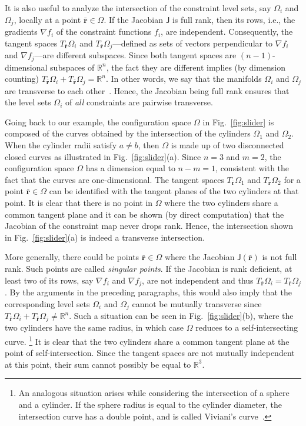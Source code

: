 It is also useful to analyze the intersection of the constraint level sets, say $\Omega_i$ and $\Omega_j$, locally at a point $\bar{\bm{r}} \in \Omega$.
If the Jacobian $\mathsf{J}$ is full rank, then its rows, i.e., the gradients $\nabla f_i$ of the constraint functions $f_i$, are independent.
Consequently, the tangent spaces $T_{\bar{\bm{r}}}{\Omega_i}$ and $T_{\bar{\bm{r}}}{\Omega_j}$---defined as sets of vectors perpendicular to $\nabla f_i$ and $\nabla f_j$---are different subspaces.
Since both tangent spaces are $(n-1)$-dimensional subspaces of $\mathbb{R}^n$, the fact they are different implies (by dimension counting) $T_{\bar{\bm{r}}}{\Omega_i} + T_{\bar{\bm{r}}}{\Omega_j} = \mathbb{R}^n$.
In other words, we say that the manifolds $\Omega_i$ and $\Omega_j$ are transverse to each other~\cite{guillemin1974}.
Hence, the Jacobian being full rank ensures that the level sets $\Omega_i$ of \emph{all} constraints are pairwise transverse.

Going back to our example, the configuration space $\Omega$ in Fig.~\ref{fig:slider} is composed of the curves obtained by the intersection of the cylinders $\Omega_1$ and $\Omega_2$.
When the cylinder radii satisfy $a \neq b$, then $\Omega$ is made up of two disconnected closed curves as illustrated in Fig.~\ref{fig:slider}(a).
Since $n = 3$ and $m=2$, the configuration space $\Omega$ has a dimension equal to $n-m=1$, consistent with the fact that the curves are one-dimensional.
The tangent spaces $T_{\bar{\bm{r}}}\Omega_1$ and $T_{\bar{\bm{r}}}\Omega_2$ for a point $\bar{\bm{r}} \in \Omega$ can be identified with the tangent planes of the two cylinders at that point.
It is clear that there is no point in $\Omega$ where the two cylinders share a common tangent plane and it can be shown (by direct computation) that the Jacobian of the constraint map never drops rank.
Hence, the intersection shown in Fig.~\ref{fig:slider}(a) is indeed a transverse intersection.

More generally, there could be points $\bar{\bm{r}} \in \Omega$ where the Jacobian $\mathsf{J}(\bar{\bm{r}})$ is not full rank.
Such points are called \emph{singular points}.
If the Jacobian is rank deficient, at least two of its rows, say $\nabla f_i$ and $\nabla f_j$, are not independent and thus $T_{\bar{\bm{r}}}\Omega_i = T_{\bar{\bm{r}}}\Omega_j$.
By the arguments in the preceding paragraphs, this would also imply that the corresponding level sets $\Omega_i$ and $\Omega_j$ cannot be mutually transverse since $T_{\bar{\bm{r}}}\Omega_i + T_{\bar{\bm{r}}}\Omega_j \neq \mathbb{R}^n$.
Such a situation can be seen in Fig.~\ref{fig:slider}(b), where the two cylinders have the same radius, in which case $\Omega$ reduces to a self-intersecting curve.%
\footnote{An analogous situation arises while considering the intersection of a sphere and a cylinder.
If the sphere radius is equal to the cylinder diameter, the intersection curve has a double point, and is called Viviani's curve~\cite{struik1988}.}
It is clear that the two cylinders share a common tangent plane at the point of self-intersection.
Since the tangent spaces are not mutually independent at this point, their sum cannot possibly be equal to $\mathbb{R}^3$.

